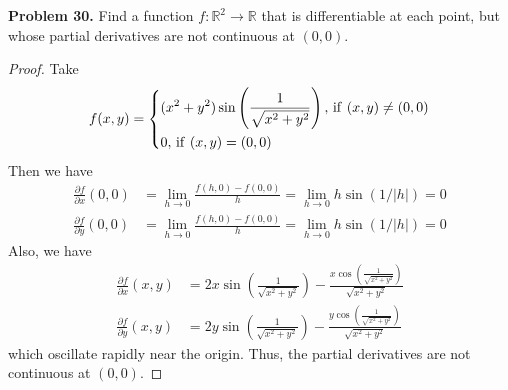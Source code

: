\documentclass[12pt,leqno]{amsart}
\theoremstyle{definition}
\begin{document}
\medskip

\noindent
{\bf Problem 30.}
Find a function $f:\mathbb{R}^2\to\mathbb{R}$ that is differentiable at each point,
but whose partial derivatives are not continuous at $(0,0)$.
\begin{proof}
Take 
\begin{align*}
    f(x,y) = \left\{
    \begin{aligned}
        & (x^2 + y^2) \sin \left(\frac{1}{\sqrt{x^2 + y^2}}\right),\, {\rm if }\,\, (x,y)\neq (0,0)\\
        & 0, \, {\rm if }\,\, (x,y) = (0,0)
    \end{aligned}
    \right.
\end{align*}
Then we have 
\begin{align*}
    \frac{\partial f}{\partial x}(0,0) & = \lim_{h\to 0} \frac{f(h,0) - f(0,0)}{h} = \lim_{h\to 0} h \sin \left(1/|h|\right) = 0 \\
    \frac{\partial f}{\partial y}(0,0) & = \lim_{h\to 0} \frac{f(h,0) - f(0,0)}{h} = \lim_{h\to 0} h \sin \left(1/|h|\right) = 0 
\end{align*}
Also, we have
\begin{align*}
    \frac{\partial f}{\partial x}(x,y) & = 2x \sin \left(\frac{1}{\sqrt{x^2 + y^2}}\right) - \frac{x \cos \left(\frac{1}{\sqrt{x^2 + y^2}}\right)}{\sqrt{x^2 + y^2}} \\
    \frac{\partial f}{\partial y}(x,y) & = 2y \sin \left(\frac{1}{\sqrt{x^2 + y^2}}\right) - \frac{y \cos \left(\frac{1}{\sqrt{x^2 + y^2}}\right)}{\sqrt{x^2 + y^2}}
\end{align*}
which oscillate rapidly near the origin. Thus, the partial derivatives are not continuous at $(0,0)$.
\end{proof}

\medskip
\end{document}
